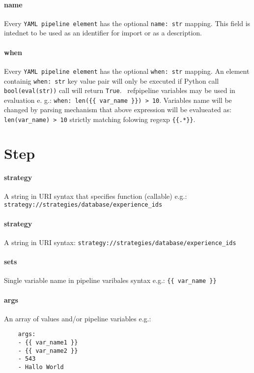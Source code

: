 \documentclass[14pt]{article}
\begin{document}
\begin{multicols}{2}
\paragraph{name}Every \verb|YAML pipeline element| has the optional \verb|name: str| mapping. This field is intednet to be used as an identifier for import or as a description.

\paragraph{when}
Every \verb|YAML pipeline element| has the optional \verb|when: str| mapping. An element containig \verb|when: str| key value pair will only be executed if Python call \verb|bool(eval(str))| call will return \verb|True|. ~ref{pipeline variables} may be used in evaluation e. g.: \verb|when: len({{ var_name }}) > 10|. Variables name will be changed by parsing mechanism that above expression will be evalueated as: \verb|len(var_name) > 10| strictly matching folowing regexp \verb|{{.*}}|.

\section{Step}\label{step_info}
\paragraph{strategy}
A string in URI syntax that specifies function (callable) e.g.: \verb|strategy://strategies/database/experience_ids|

\paragraph{strategy}
A string in URI syntax: \verb|strategy://strategies/database/experience_ids|

\paragraph{sets}
Single variable name in pipeline varibales syntax e.g.: \verb|{{ var_name }}|

\paragraph{args}
An array of values and/or pipeline variables e.g.: 
\begin{verbatim}
	args:
	- {{ var_name1 }}
	- {{ var_name2 }}
	- 543
	- Hallo World 
\end{verbatim}


\end{multicols}
\end{document}
